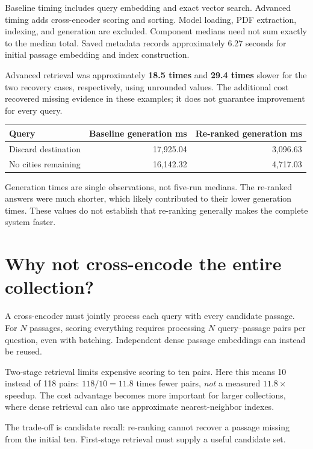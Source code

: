 \documentclass[10pt,a4paper]{article}
\begin{document}
Baseline timing includes query embedding and exact vector search. Advanced timing adds cross-encoder scoring and sorting. Model loading, PDF extraction, indexing, and generation are excluded. Component medians need not sum exactly to the median total. Saved metadata records approximately 6.27 seconds for initial passage embedding and index construction.

Advanced retrieval was approximately \textbf{18.5 times} and \textbf{29.4 times} slower for the two recovery cases, respectively, using unrounded values. The additional cost recovered missing evidence in these examples; it does not guarantee improvement for every query.

\begin{center}
\small
\begin{tabularx}{\linewidth}{@{}Xrr@{}}
\toprule
Query & Baseline generation ms & Re-ranked generation ms\\
\midrule
Discard destination & 17,925.04 & 3,096.63\\
No cities remaining & 16,142.32 & 4,717.03\\
\bottomrule
\end{tabularx}
\end{center}

Generation times are single observations, not five-run medians. The re-ranked answers were much shorter, which likely contributed to their lower generation times. These values do not establish that re-ranking generally makes the complete system faster.

\section{Why not cross-encode the entire collection?}
A cross-encoder must jointly process each query with every candidate passage. For $N$ passages, scoring everything requires processing $N$ query--passage pairs per question, even with batching. Independent dense passage embeddings can instead be reused.

Two-stage retrieval limits expensive scoring to ten pairs. Here this means 10 instead of 118 pairs: $118/10=11.8$ times fewer pairs, \emph{not} a measured $11.8\times$ speedup. The cost advantage becomes more important for larger collections, where dense retrieval can also use approximate nearest-neighbor indexes.

The trade-off is candidate recall: re-ranking cannot recover a passage missing from the initial ten. First-stage retrieval must supply a useful candidate set.
\end{document}
